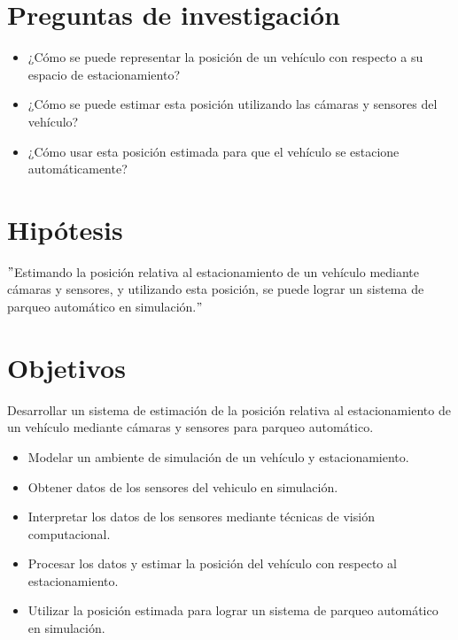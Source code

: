 \documentclass[12pt,letterpaper,final]{article}
\begin{document}
    \clearpage

    \section*{Preguntas de investigación}
    \begin{itemize}
        \item ¿Cómo se puede representar la posición de un vehículo con respecto a su espacio de estacionamiento?
        \item ¿Cómo se puede estimar esta posición utilizando las cámaras y sensores del vehículo?
        \item ¿Cómo usar esta posición estimada para que el vehículo se estacione automáticamente?
    \end{itemize}

    \section*{Hipótesis}
    \("\)Estimando la posición relativa al estacionamiento de un vehículo mediante cámaras y sensores,
    y utilizando esta posición, se puede lograr un sistema de parqueo automático en simulación.\("\)

    \section*{Objetivos}
    \newline
    \noindent Desarrollar un sistema de estimación de la posición relativa al estacionamiento de un vehículo mediante cámaras y sensores para parqueo automático.
    \newline
    \newline
    \begin{itemize}
        \item Modelar un ambiente de simulación de un vehículo y estacionamiento.
        \item Obtener datos de los sensores del vehiculo en simulación.
        \item Interpretar los datos de los sensores mediante técnicas de visión computacional.
        \item Procesar los datos y estimar la posición del vehículo con respecto al estacionamiento.
        \item Utilizar la posición estimada para lograr un sistema de parqueo automático en simulación.
    \end{itemize}
    \clearpage
\end{document}
